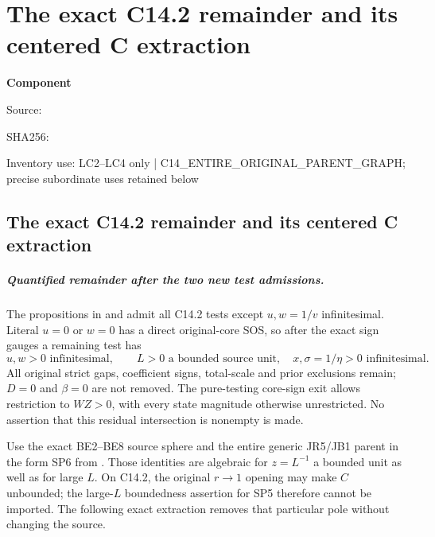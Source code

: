 \chapter{The exact C14.2 remainder and its centered C extraction}
\label{component:p156da4167158}
\noindent\textbf{Component }\par
{\small\noindent Source: \par}
{\small\noindent SHA256: \par}
{\small\noindent Inventory use: LC2--LC4 only | C14\_\allowbreak{}ENTIRE\_\allowbreak{}ORIGINAL\_\allowbreak{}PARENT\_\allowbreak{}GRAPH; precise subordinate uses retained below\par}
\medskip
\section{The exact C14.2 remainder and its centered C extraction}

\paragraph{Quantified remainder after the two new test admissions.}
The propositions in  and
 admit all C14.2 tests except $u,w=1/v$
infinitesimal.  Literal $u=0$ or $w=0$ has a direct original-core
SOS, so after the exact sign gauges a remaining test has
\[
 u,w>0\text{ infinitesimal},\qquad
 L>0\text{ a bounded source unit},\quad
 x,\sigma=1/\eta>0\text{ infinitesimal}.             \tag{LC1}
\]
All original strict gaps, coefficient signs, total-scale and prior
exclusions remain; $D=0$ and $\beta=0$ are not removed.
The pure-testing core-sign exit allows restriction to $WZ>0$,
with every state magnitude otherwise unrestricted.  No assertion
that this residual intersection is nonempty is made.

Use the exact BE2--BE8 source sphere and the entire generic JR5/JB1
parent in the form SP6 from
.
Those identities are algebraic for $z=L^{-1}$ a bounded unit as
well as for large $L$.  On C14.2, the original $r\to1$ opening
may make $C$ unbounded; the large-$L$ boundedness assertion for
SP5 therefore cannot be imported.  The following exact extraction
removes that particular pole without changing the source.

